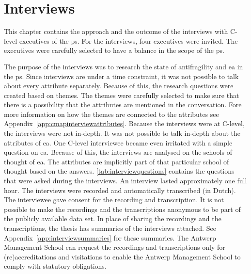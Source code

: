\chapter{Interviews}
\label{ch:interviews}
This chapter contains the approach and the outcome of the interviews with C-level executives of the \gls{ps}. For the interviews, four executives were invited. The executives were carefully selected to have a balance in the scope of the \gls{ps}.
\begin{table}[H]
	\centering
	\caption[Interviewees]{Interviewees}%
	\label{tab:Interviewees}%
\end{table}
The purpose of the interviews was to research the state of \gls{antifragility} and \acrshort{ea} in the \gls{ps}. Since interviews are under a time constraint, it was not possible to talk about every \gls{attribute} separately. Because of this, the research questions were created based on themes. The themes were carefully selected to make sure that there is a possibility that the \glspl{attribute} are mentioned in the conversation. Fore more information on how the themes are connected to the \glspl{attribute} see Appendix~\ref{app:cmapinterviewattributes}. Because the interviews were at C-level, the interviews were not in-depth. It was not possible to talk in-depth about the attributes of \acrshort{ea}. One C-level interviewee became even irritated with a simple question on \acrshort{ea}. Because of this, the interviews are analysed on the schools of thought \parencite{Lapalme2012} of \acrshort{ea}. The attributes are implicitly part of that particular school of thought based on the answers. \cref{tab:interviewquestions} contains the questions that were asked during the interviews. An interview lasted approximately one full hour. The interviews were recorded and automatically transcribed (in Dutch). The interviewee gave consent for the recording and transcription. It is not possible to make the recordings and the transcriptions anonymous to be part of the publicly available data set. In place of sharing the recordings and the transcriptions, the thesis has summaries of the interviews attached. See Appendix~\ref{app:interviewsummaries} for these summaries. The Antwerp Management School can request the recordings and transcriptions only for (re)accreditations and visitations to enable the Antwerp Management School to comply with statutory obligations.
